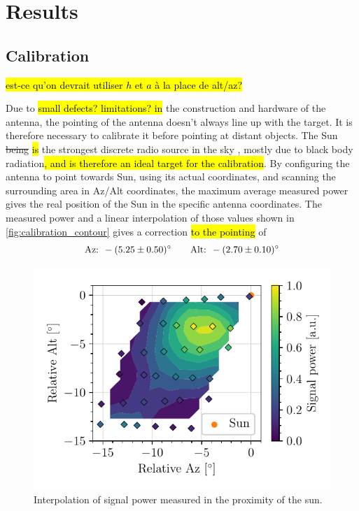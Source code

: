 \section{Results}
\subsection{Calibration}
\hl{est-ce qu'on devrait utiliser $h$ et $a$ à la place de alt/az?}

Due to \hl{small defects? limitations? in }the construction and hardware of the antenna, the pointing of the antenna doesn't always line up with the target. It is therefore necessary to calibrate it before pointing at distant objects. The Sun \st{being} \hl{is} the strongest discrete radio source in the sky \cite{burke_introduction_2013}, mostly due to black body radiation\hl{, and is therefore an ideal target for the calibration}.
By configuring the antenna to point towards Sun, using its actual coordinates, and scanning the surrounding area in Az/Alt coordinates, the maximum average measured power gives the real position of the Sun in the specific antenna coordinates. The measured power and a linear interpolation of those values shown in \autoref{fig:calibration_contour} gives a correction \hl{to the pointing} of
\begin{equation}
    \textrm{Az: } -(5.25 \pm 0.50)^\circ \qquad \textrm{Alt: } -(2.70 \pm 0.10)^\circ \\
\end{equation}
\begin{figure}[htbp]
    \centering
    \includegraphics[scale=1]{figures/calibration_contour.pdf}
    \caption{Interpolation of signal power measured in the proximity of the sun. }
    \label{fig:calibration_contour}
\end{figure}

